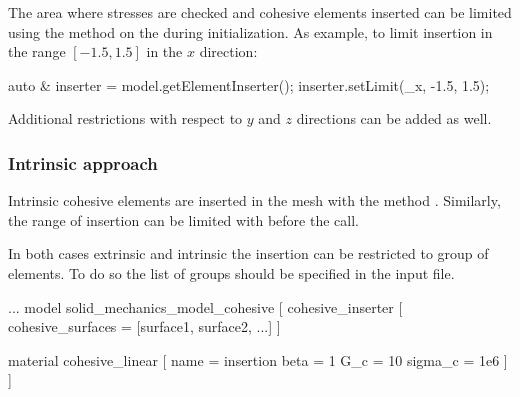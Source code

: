 The area where stresses are checked and cohesive elements inserted can
be limited using the method  on the  during
initialization. As example, to limit insertion in the range $[-1.5,
1.5]$ in the $x$ direction:
\begin{cpp}
  auto & inserter = model.getElementInserter();
  inserter.setLimit(_x, -1.5, 1.5);
\end{cpp} 
Additional restrictions with respect to $y$ and $z$ directions can be added as well.

\subsubsection{Intrinsic approach \label{intrinsic_insertion}}
Intrinsic cohesive elements are inserted in the mesh with the method
. Similarly, the range of insertion can be limited 
with  before the  call.

In both cases extrinsic and intrinsic the insertion can be restricted to group of elements. To do so the list of groups should be specified in the input file.

\begin{cpp}
  ...
  model solid_mechanics_model_cohesive [
    cohesive_inserter [
      cohesive_surfaces = [surface1, surface2, ...]
    ]

    material cohesive_linear [
      name = insertion
      beta = 1
      G_c = 10
      sigma_c = 1e6
    ]
  ]
\end{cpp}
